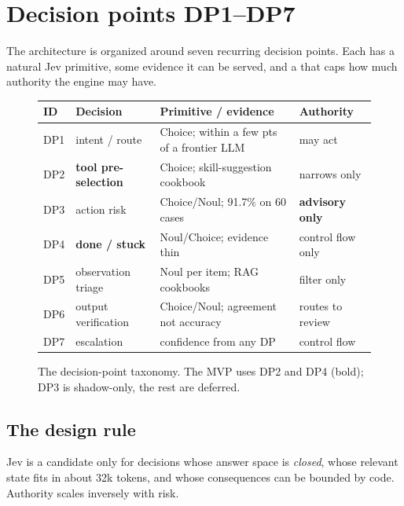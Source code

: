 \chapter{Decision points DP1--DP7}
\label{ch:decisionpoints}

The architecture is organized around seven recurring decision points. Each has a natural Jev
primitive, some evidence it can be served, and a  that caps how much
authority the engine may have.

\begin{figure}[h]\centering
\small
\begin{tabular}{@{}llp{5.2cm}l@{}}
\toprule
ID & Decision & Primitive / evidence & Authority \\
\midrule
DP1 & intent / route & Choice; \IND{} within a few pts of a frontier LLM & may act \\
DP2 & \textbf{tool pre-selection} & Choice; \VENDOR{} skill-suggestion cookbook & narrows only \\
DP3 & action risk & Choice/Noul; \IND{} 91.7\% on 60 cases & \textbf{advisory only} \\
DP4 & \textbf{done / stuck} & Noul/Choice; evidence thin & control flow only \\
DP5 & observation triage & Noul per item; \VENDOR{} RAG cookbooks & filter only \\
DP6 & output verification & Choice/Noul; \IND{} agreement not accuracy & routes to review \\
DP7 & escalation & confidence from any DP & control flow \\
\bottomrule
\end{tabular}
\caption{The decision-point taxonomy. The MVP uses DP2 and DP4 (bold); DP3 is shadow-only,
the rest are deferred.}
\label{fig:dptaxonomy}
\end{figure}

\section{The design rule}

Jev is a candidate only for decisions whose answer space is \emph{closed}, whose relevant
state fits in about 32k tokens, and whose consequences can be bounded by code. Authority
scales inversely with risk.

